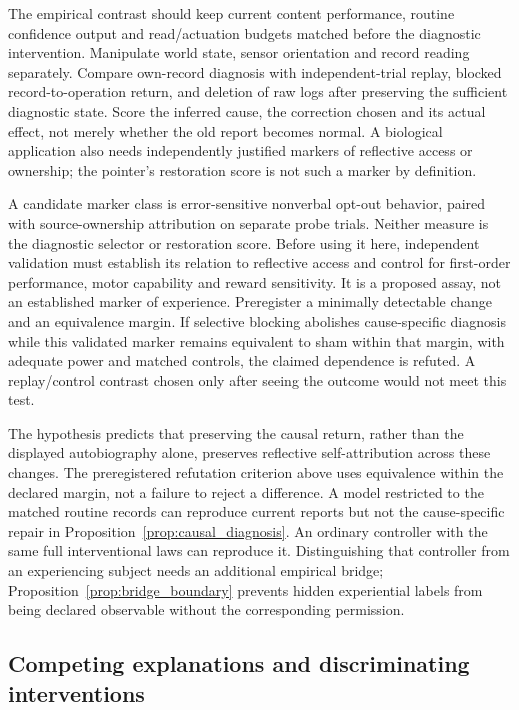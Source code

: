 \documentclass[12pt]{article}
\theoremstyle{definition}
\theoremstyle{remark}
\begin{document}
The empirical contrast should keep current content performance, routine
confidence output and read/actuation budgets matched before the
diagnostic intervention. Manipulate world state, sensor orientation and
record reading separately. Compare own-record diagnosis with
independent-trial replay, blocked record-to-operation return, and
deletion of raw logs after preserving the sufficient diagnostic state.
Score the inferred cause, the correction chosen and its actual effect,
not merely whether the old report becomes normal. A biological
application also needs independently justified markers of reflective
access or ownership; the pointer's restoration score is not such a
marker by definition.

A candidate marker class is error-sensitive nonverbal opt-out behavior,
paired with source-ownership attribution on separate probe trials.
Neither measure is the diagnostic selector or restoration score.
Before using it here, independent validation must establish its
relation to reflective access and control for first-order performance,
motor capability and reward sensitivity. It is a proposed assay,
not an established marker of experience.
Preregister a minimally detectable change and an equivalence margin.
If selective blocking abolishes cause-specific diagnosis while this
validated marker remains equivalent to sham within that margin,
with adequate power and matched controls, the claimed dependence
is refuted. A replay/control contrast chosen only after seeing the
outcome would not meet this test.

The hypothesis predicts that preserving the causal return, rather than
the displayed autobiography alone, preserves reflective self-attribution
across these changes. The preregistered refutation criterion above
uses equivalence within the declared margin, not a failure to reject
a difference. A model restricted to the matched routine records can reproduce
current reports but not the cause-specific repair in
Proposition~\ref{prop:causal_diagnosis}.
An ordinary controller with the same full interventional laws can
reproduce it. Distinguishing that controller from an experiencing
subject needs an additional empirical bridge; Proposition~\ref{prop:bridge_boundary}
prevents hidden experiential labels from being declared observable
without the corresponding permission.

\subsection{Competing explanations and discriminating interventions}
\end{document}
